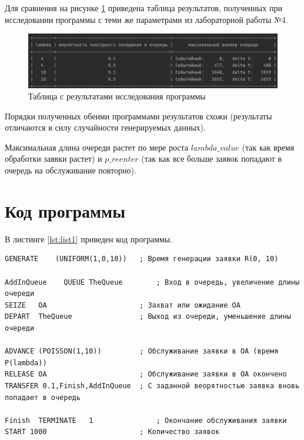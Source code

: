 \documentclass[14pt, a4paper]{extarticle}
\begin{document}
Для сравнения на рисунке \ref{pic:1} приведена таблица результатов, полученных при исследовании программы с теми же параметрами из лабораторной работы №4.



\begin{figure}[h]
	\begin{center}
		{\includegraphics[scale=0.85]{pictures/res_table.png}
			\caption{Таблица с результатами исследования программы}
			\label{pic:1}}
	\end{center}
\end{figure}

Порядки полученных обеими программами результатов схожи (результаты отличаются в силу случайности генерируемых данных).

Максимальная длина очереди растет по мере роста $lambda\_value$ (так как время обработки заявки растет) и $p\_reenter$ (так как все больше заявок попадают в очередь на обслуживание повторно).

\section{Код программы}

В листинге \ref{lst:list1} приведен код программы. 

\begin{lstlisting}[caption = {Код программы}, label=lst:list1]
	GENERATE	(UNIFORM(1,0,10))	; Время генерации заявки R(0, 10)

AddInQueue    QUEUE	TheQueue		; Вход в очередь, увеличение длины очереди
SEIZE	OA						; Захват или ожидание ОА
DEPART	TheQueue				; Выход из очереди, уменьшение длины очереди

ADVANCE	(POISSON(1,10))			; Обслуживание заявки в ОА (время P(lambda))
RELEASE	OA						; Обслуживание заявки в ОА окончено
TRANSFER 0.1,Finish,AddInQueue	; С заданной веорятностью заявка вновь попадает в очередь

Finish	TERMINATE	1				; Окончание обслуживания заявки
START 1000						; Количество заявок
\end{lstlisting}
\end{document}
